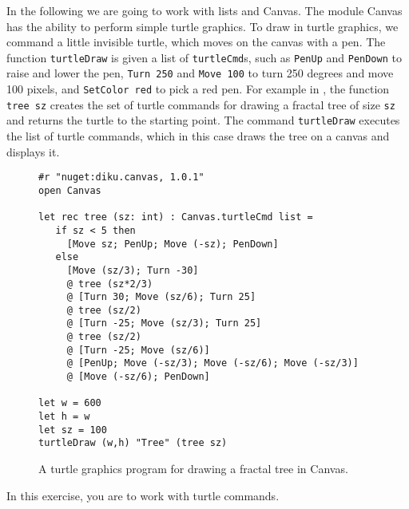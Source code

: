 In the following we are going to work with lists and Canvas. The module Canvas has the ability to perform simple turtle graphics. To draw in turtle graphics, we command a little invisible turtle, which moves on the canvas with a pen. The function \lstinline{turtleDraw} is given a list of \lstinline{turtleCmd}s, such as \lstinline{PenUp} and  \lstinline{PenDown} to raise and lower the pen, \lstinline{Turn 250} and \lstinline{Move 100} to turn 250 degrees and move 100 pixels, and \lstinline{SetColor red} to pick a red pen. For example in ,  the function \mbox{\lstinline{tree sz}} creates the set of turtle commands for drawing a fractal tree of size \lstinline{sz} and returns the turtle to the starting point. The command \lstinline{turtleDraw} executes the list of turtle commands, which in this case draws the tree on a canvas and displays it.
\begin{figure}
\begin{lstlisting}
#r "nuget:diku.canvas, 1.0.1"
open Canvas

let rec tree (sz: int) : Canvas.turtleCmd list = 
   if sz < 5 then 
     [Move sz; PenUp; Move (-sz); PenDown]
   else 
     [Move (sz/3); Turn -30] 
     @ tree (sz*2/3) 
     @ [Turn 30; Move (sz/6); Turn 25] 
     @ tree (sz/2) 
     @ [Turn -25; Move (sz/3); Turn 25] 
     @ tree (sz/2) 
     @ [Turn -25; Move (sz/6)]
     @ [PenUp; Move (-sz/3); Move (-sz/6); Move (-sz/3)]
     @ [Move (-sz/6); PenDown]
     
let w = 600
let h = w
let sz = 100
turtleDraw (w,h) "Tree" (tree sz)
\end{lstlisting}
\caption{A turtle graphics program for drawing a fractal tree in Canvas.}
\label{fig:tree}
\end{figure}
In this exercise, you are to work with turtle commands.